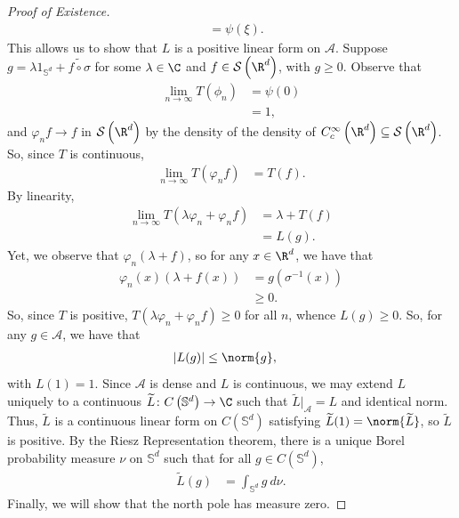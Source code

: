 \documentclass[10pt]{mypackage}
\begin{document}
\begin{proof}[Proof of Existence]
\begin{align*}
                                                     &= \psi\left( \xi \right).
  \end{align*}
  This allows us to show that $L$ is a positive linear form on $\mathcal{A}$. Suppose $g = \lambda 1_{ \mathbb{S}^d } + \widetilde{f\circ\sigma}$ for some $\lambda\in \C$ and $f\in \mathcal{S}\left( \R^d \right)$, with $g\geq 0$. Observe that
  \begin{align*}
    \lim_{n\to\infty}T\left( \phi_n \right) &= \psi(0)\\
                                           &= 1,
  \end{align*}
  and $\varphi_nf \to f$ in $ \mathcal{S}\left( \R^d \right) $ by the density of the density of $C_c^{\infty}\left( \R^d \right)\subseteq \mathcal{S}\left( \R^d \right)$. So, since $T$ is continuous,
  \begin{align*}
    \lim_{n\to\infty} T\left( \varphi_nf \right) &= T(f).
  \end{align*}
  By linearity,
  \begin{align*}
    \lim_{n\to\infty} T\left( \lambda \varphi_n + \varphi_n f \right) &= \lambda + T(f)\\
                                                                      &= L(g).
  \end{align*}
  Yet, we observe that $\varphi_n\left( \lambda + f \right)$, so for any $x\in \R^d$, we have that
  \begin{align*}
    \varphi_n(x)\left( \lambda + f(x) \right) &= g\left( \sigma^{-1}\left( x \right) \right)\\
                                              &\geq 0.
  \end{align*}
  So, since $T$ is positive, $T\left( \lambda\varphi_n + \varphi_nf \right) \geq 0$ for all $n$, whence $L(g) \geq 0$. So, for any $g\in \mathcal{A}$, we have that 
  \begin{align*}
    \left\vert L(g) \right\vert &\leq \norm{g},
  \end{align*}
  with $L(1) = 1$. Since $\mathcal{A}$ is dense and $L$ is continuous, we may extend $L$ uniquely to a continuous $ \widetilde{L}\colon C\left( \mathbb{S}^d \right)\to \C $ such that $ \widetilde{L}|_{ \mathcal{A} } = L $ and identical norm. Thus, $ \widetilde{L} $ is a continuous linear form on $C\left( \mathbb{S}^d \right)$ satisfying $ \widetilde{L}(1) = \norm{ \widetilde{L} }$, so $ \widetilde{L} $ is positive. By the Riesz Representation theorem, there is a unique Borel probability measure $\nu$ on $ \mathbb{S}^d $ such that for all $g\in C\left( \mathbb{S}^d \right)$, 
  \begin{align*}
    \widetilde{L}(g) &= \int_{ \mathbb{S}^d }^{} g\:d\nu.
  \end{align*}
  Finally, we will show that the north pole has measure zero.


\end{proof}
\end{document}
